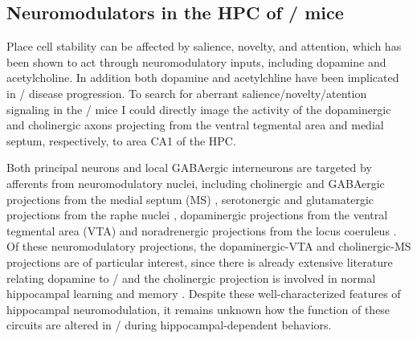 \subsection{Neuromodulators in the \acl{HPC} of \df/ mice}
Place cell stability can be affected by salience, novelty, and attention, which has been shown to act through neuromodulatory inputs, including dopamine and acetylcholine.
In addition both dopamine and acetylchline have been implicated in \scz/ disease progression.
To search for aberrant salience/novelty/atention signaling in the \df/ mice I could directly image the activity of the dopaminergic and cholinergic axons projecting from the ventral tegmental area and medial septum, respectively, to area CA1 of the \ac{HPC}.

Both principal neurons and local GABAergic interneurons are targeted by afferents from neuromodulatory nuclei, including cholinergic and GABAergic projections from the medial septum (MS) \citep{Klausberger2008}, serotonergic and glutamatergic projections from the raphe nuclei \citep{Varga2009}, dopaminergic projections from the ventral tegmental area (VTA) \citep{Gasbarri1997} and noradrenergic projections from the locus coeruleus \citep{Foote1983}.
Of these neuromodulatory projections, the dopaminergic-VTA and cholinergic-MS projections are of particular interest, since there is already extensive literature relating dopamine to \scz/ \citep{Davis1991} and the cholinergic projection is involved in normal hippocampal learning and memory \citep{Parent2004}.
Despite these well-characterized features of hippocampal neuromodulation, it remains unknown how the function of these circuits are altered in \scz/ during hippocampal-dependent behaviors.
